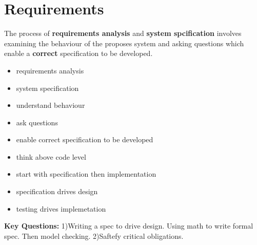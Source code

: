 \documentclass{article}
\begin{document}
    \section{Requirements}
    The process of \textbf{requirements analysis} and \textbf{system spcification}
    involves examining the behaviour of the proposes system and asking questions
    which enable a \textbf{correct} specification to be developed. 
    \begin{itemize}
        \item requirements analysis
        \item system specification 
        \item understand behaviour
        \item ask questions
        \item enable correct specification to be developed
        \item think above code level
        \item start with specification then implementation 
        \item specification drives design 
        \item testing drives implemetation 
    \end{itemize}

    \textbf{Key Questions:}
    1)Writing a spec to drive design. Using math to write formal spec. Then model checking.
    2)Saftefy critical obligations.\\
\end{document}
